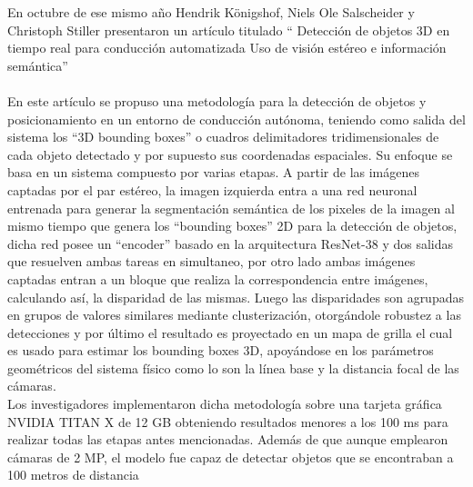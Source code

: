En octubre de ese mismo año  Hendrik Königshof, Niels Ole Salscheider y Christoph Stiller presentaron un artículo titulado ``
Detección de objetos 3D en tiempo real para conducción automatizada
Uso de visión estéreo e información semántica'' \cite{Königshof}
\\
\\ 
En este artículo se propuso una metodología para la detección de objetos y posicionamiento en un entorno de conducción autónoma, teniendo como salida del sistema los ``3D bounding boxes'' o cuadros delimitadores tridimensionales de cada objeto detectado y por supuesto sus coordenadas espaciales. Su enfoque se basa en un sistema compuesto por varias etapas. A partir de las imágenes captadas por el par estéreo, la imagen izquierda entra a una red neuronal entrenada para generar la segmentación semántica de los pixeles de la imagen al mismo tiempo que genera los ``bounding boxes'' 2D para la detección de objetos, dicha red posee un ``encoder'' basado en la arquitectura ResNet-38 y dos salidas que resuelven ambas tareas en simultaneo, por otro lado ambas imágenes captadas entran a un bloque que realiza la correspondencia entre imágenes, calculando así, la disparidad de las mismas. Luego las disparidades son agrupadas en grupos
de valores similares mediante clusterización, otorgándole robustez a las detecciones y por último el resultado es proyectado en un mapa de grilla el cual es usado para estimar los bounding boxes 3D, apoyándose en los parámetros geométricos del sistema físico como lo son la línea base y la distancia focal de las cámaras.
\\
Los investigadores implementaron dicha metodología sobre una tarjeta gráfica NVIDIA TITAN X de 12 GB obteniendo resultados menores a los 100 ms para realizar todas las etapas antes mencionadas. Además de que aunque emplearon cámaras de 2 MP, el modelo fue capaz de detectar objetos que se encontraban a 100 metros de distancia